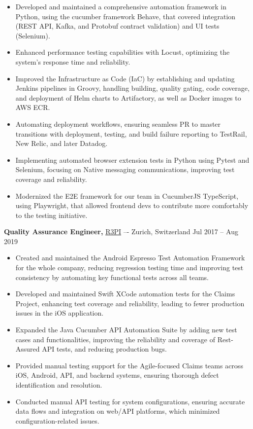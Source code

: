 \documentclass[11pt]{article}       %
\begin{document}
\begin{itemize}
    \item Developed and maintained a comprehensive automation framework in Python, using the cucumber framework Behave, that covered integration (REST API, Kafka, and Protobuf contract validation) and UI tests (Selenium).
    \item Enhanced performance testing capabilities with Locust, optimizing the system's response time and reliability.
    \item Improved the Infrastructure as Code (IaC) by establishing and updating Jenkins pipelines in Groovy, handling building, quality gating, code coverage, and deployment of Helm charts to Artifactory, as well as Docker images to AWS ECR.
    \item Automating deployment workflows, ensuring seamless PR to master transitions with deployment, testing, and build failure reporting to TestRail, New Relic, and later Datadog.
    \item Implementing automated browser extension tests in Python using Pytest and Selenium, focusing on Native messaging communications, improving test coverage and reliability.
    \item Modernized the E2E framework for our team in CucumberJS TypeScript, using Playwright, that allowed frontend devs to contribute more comfortably to the testing initiative.
\end{itemize}

\textbf{Quality Assurance Engineer,} \href{https://www.solera.com/}{R3PI} –- Zurich, Switzerland \hfill Jul 2017 – Aug 2019
\vspace{-9pt}

\begin{itemize}
    \item Created and maintained the Android Espresso Test Automation Framework for the whole company, reducing regression testing time and improving test consistency by automating key functional tests across all teams.
    \item Developed and maintained Swift XCode automation tests for the Claims Project, enhancing test coverage and reliability, leading to fewer production issues in the iOS application.
    \item Expanded the Java Cucumber API Automation Suite by adding new test cases and functionalities, improving the reliability and coverage of Rest-Assured API tests, and reducing production bugs.
    \item Provided manual testing support for the Agile-focused Claims teams across iOS, Android, API, and backend systems, ensuring thorough defect identification and resolution.
    \item Conducted manual API testing for system configurations, ensuring accurate data flows and integration on web/API platforms, which minimized configuration-related issues.
\end{itemize}
\end{document}
